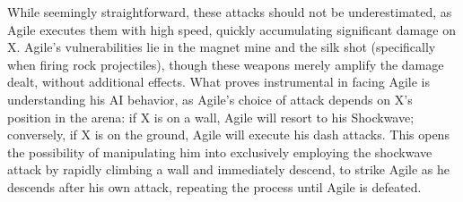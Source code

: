 While seemingly straightforward, these attacks should not be underestimated, as Agile executes them with high speed, quickly accumulating significant damage on X. Agile's vulnerabilities lie in the magnet mine and the silk shot (specifically when firing rock projectiles), though these weapons merely amplify the damage dealt, without additional effects. What proves instrumental in facing Agile is understanding his AI behavior, as Agile's choice of attack depends on X's position in the arena: if X is on a wall, Agile will resort to his Shockwave; conversely, if X is on the ground, Agile will execute his dash attacks. This opens the possibility of manipulating him into exclusively employing the shockwave attack by rapidly climbing a wall and immediately descend, to strike Agile as he descends after his own attack, repeating the process until Agile is defeated.


